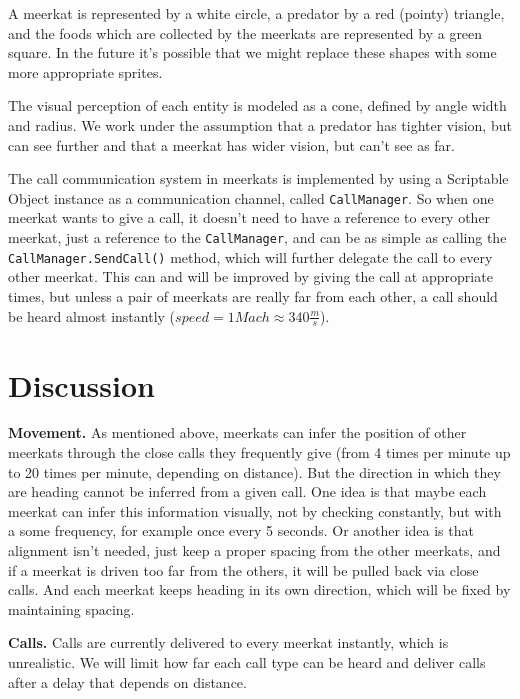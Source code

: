 \documentclass[9pt,twoside]{pnas-new}
\begin{document}
A meerkat is represented by a white circle, a predator by a red (pointy) triangle, and the foods which are collected by the meerkats are represented by a green square. In the future it's possible that we might replace these shapes with some more appropriate sprites.

The visual perception of each entity is modeled as a cone, defined by angle width and radius. We work under the assumption that a predator has tighter vision, but can see further and that a meerkat has wider vision, but can't see as far.

The call communication system in meerkats is implemented by using a Scriptable Object instance as a communication channel, called \verb|CallManager|. So when one meerkat wants to give a call, it doesn't need to have a reference to every other meerkat, just a reference to the \verb|CallManager|, and can be as simple as calling the \verb|CallManager.SendCall()| method, which will further delegate the call to every other meerkat. This can and will be improved by giving the call at appropriate times, but unless a pair of meerkats are really far from each other, a call should be heard almost instantly ($speed = 1 Mach \approx 340 \frac{m}{s}$).

\section{Discussion}
\label{discussion}


\textbf{Movement.} As mentioned above, meerkats can infer the position of other meerkats through the close calls they frequently give (from 4 times per minute up to 20 times per minute, depending on distance). 
But the direction in which they are heading cannot be inferred from a given call. One idea is that maybe each meerkat can infer this information visually, not by checking constantly, but with a some frequency, for example once every 5 seconds. 
Or another idea is that alignment isn't needed, just keep a proper spacing from the other meerkats, and if a meerkat is driven too far from the others, it will be pulled back via close calls. And each meerkat keeps heading in its own direction, which will be fixed by maintaining spacing.

\textbf{Calls.} Calls are currently delivered to every meerkat instantly, which is unrealistic. We will limit how far each call type can be heard and deliver calls after a delay that depends on distance.
\end{document}
